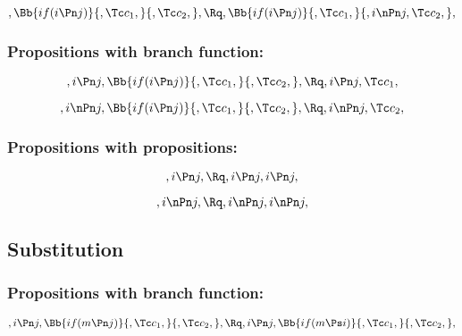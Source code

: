 \[, \Bb{if(i \Pn j)}{,\Tc c_1,}{,\Tc c_2,}, \Rq , \Bb{if(i \Pn j)}{,\Tc c_1,}{,i \nPn j,\Tc c_2,},\]

\bigskip
\bigskip
\bigskip
\bigskip
\subsubsection{Propositions with branch function:}
\[,i \Pn j, \Bb{if(i \Pn j)}{,\Tc c_1,}{,\Tc c_2,}, \Rq , i \Pn j, \Tc c_1,\]

\[,i \nPn j, \Bb{if(i \Pn j)}{,\Tc c_1,}{,\Tc c_2,}, \Rq , i \nPn j, \Tc c_2,\]


\bigskip
\bigskip
\bigskip
\bigskip
\subsubsection{Propositions with propositions:}
\[,i \Pn j, \Rq , i \Pn j, i \Pn j,\]

\[,i \nPn j, \Rq , i \nPn j, i \nPn j,\]








\bigskip
\bigskip
\bigskip
\bigskip
\subsection{ Substitution}
\subsubsection{Propositions with branch function:}
\[,i \Pn j, \Bb{if(m \Pn j)}{,\Tc c_1,}{,\Tc c_2,}, \Rq ,i \Pn j, \Bb{if(m \Ps i)}{,\Tc c_1,}{,\Tc c_2,}, \]

